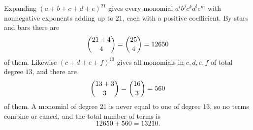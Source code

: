 Expanding $(a+b+c+d+e)^{21}$ gives every monomial $a^{i}b^{j}c^{k}d^{l}e^{m}$ with nonnegative exponents adding up to $21$, each with a positive coefficient. By stars and bars there are
\[\dbinom{21+4}{4}=\dbinom{25}{4}=12650\]
of them. Likewise $(c+d+e+f)^{13}$ gives all monomials in $c,d,e,f$ of total degree $13$, and there are
\[\dbinom{13+3}{3}=\dbinom{16}{3}=560\]
of them. A monomial of degree $21$ is never equal to one of degree $13$, so no terms combine or cancel, and the total number of terms is
\[12650+560=\boxed{13210}.\]
